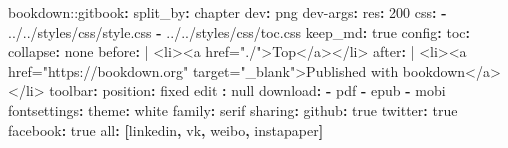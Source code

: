 \documentclass[
  nomag]{bxjsbook}
\newenvironment{Shaded}{\begin{snugshade}}{\end{snugshade}}
\newcommand{\AttributeTok}[1]{\textcolor[rgb]{0.77,0.63,0.00}{#1}}
\newcommand{\CharTok}[1]{\textcolor[rgb]{0.31,0.60,0.02}{#1}}
\newcommand{\DecValTok}[1]{\textcolor[rgb]{0.00,0.00,0.81}{#1}}
\newcommand{\FunctionTok}[1]{\textcolor[rgb]{0.00,0.00,0.00}{#1}}
\newcommand{\KeywordTok}[1]{\textcolor[rgb]{0.13,0.29,0.53}{\textbf{#1}}}
\newcommand{\NormalTok}[1]{#1}
\newcommand{\StringTok}[1]{\textcolor[rgb]{0.31,0.60,0.02}{#1}}
\theoremstyle{definition}
\theoremstyle{definition}
\theoremstyle{definition}
\theoremstyle{remark}
\begin{document}
\begin{Shaded}
\begin{Highlighting}[]
\AttributeTok{bookdown:}\FunctionTok{:gitbook}\KeywordTok{:}
\AttributeTok{  }\FunctionTok{split\_by}\KeywordTok{:}\AttributeTok{ chapter}
\AttributeTok{  }\FunctionTok{dev}\KeywordTok{:}\AttributeTok{ png}
\AttributeTok{  }\FunctionTok{dev{-}args}\KeywordTok{:}
\AttributeTok{    }\FunctionTok{res}\KeywordTok{:}\AttributeTok{ }\DecValTok{200}
\AttributeTok{  }\FunctionTok{css}\KeywordTok{:}\AttributeTok{ }
\AttributeTok{    }\KeywordTok{{-}}\AttributeTok{ }\StringTok{\textquotesingle{}../../styles/css/style.css\textquotesingle{}}
\AttributeTok{    }\KeywordTok{{-}}\AttributeTok{ }\StringTok{\textquotesingle{}../../styles/css/toc.css\textquotesingle{}}
\AttributeTok{  }\FunctionTok{keep\_md}\KeywordTok{:}\AttributeTok{ }\CharTok{true}
\AttributeTok{  }\FunctionTok{config}\KeywordTok{:}
\AttributeTok{    }\FunctionTok{toc}\KeywordTok{:}
\AttributeTok{      }\FunctionTok{collapse}\KeywordTok{:}\AttributeTok{ none}
\FunctionTok{      before}\KeywordTok{: }\CharTok{|}
\NormalTok{        \textless{}li\textgreater{}\textless{}a href="./"\textgreater{}Top\textless{}/a\textgreater{}\textless{}/li\textgreater{}}
\FunctionTok{      after}\KeywordTok{: }\CharTok{|}
\NormalTok{        \textless{}li\textgreater{}\textless{}a href="https://bookdown.org" target="\_blank"\textgreater{}Published with bookdown\textless{}/a\textgreater{}\textless{}/li\textgreater{}}
\AttributeTok{    }\FunctionTok{toolbar}\KeywordTok{:}
\AttributeTok{      }\FunctionTok{position}\KeywordTok{:}\AttributeTok{ fixed}
\AttributeTok{    }\FunctionTok{edit }\KeywordTok{:}\AttributeTok{ }\CharTok{null}
\AttributeTok{    }\FunctionTok{download}\KeywordTok{:}
\AttributeTok{      }\KeywordTok{{-}}\AttributeTok{ pdf}
\AttributeTok{      }\KeywordTok{{-}}\AttributeTok{ epub}
\AttributeTok{      }\KeywordTok{{-}}\AttributeTok{ mobi}
\AttributeTok{    }\FunctionTok{fontsettings}\KeywordTok{:}
\AttributeTok{      }\FunctionTok{theme}\KeywordTok{:}\AttributeTok{ white}
\AttributeTok{      }\FunctionTok{family}\KeywordTok{:}\AttributeTok{ serif}
\AttributeTok{    }\FunctionTok{sharing}\KeywordTok{:}
\AttributeTok{      }\FunctionTok{github}\KeywordTok{:}\AttributeTok{ }\CharTok{true}
\AttributeTok{      }\FunctionTok{twitter}\KeywordTok{:}\AttributeTok{ }\CharTok{true}
\AttributeTok{      }\FunctionTok{facebook}\KeywordTok{:}\AttributeTok{ }\CharTok{true}
\AttributeTok{      }\FunctionTok{all}\KeywordTok{:}\AttributeTok{ }\KeywordTok{[}\StringTok{\textquotesingle{}linkedin\textquotesingle{}}\KeywordTok{,}\AttributeTok{ }\StringTok{\textquotesingle{}vk\textquotesingle{}}\KeywordTok{,}\AttributeTok{ }\StringTok{\textquotesingle{}weibo\textquotesingle{}}\KeywordTok{,}\AttributeTok{ }\StringTok{\textquotesingle{}instapaper\textquotesingle{}}\KeywordTok{]}
\end{Highlighting}
\end{Shaded}
\end{document}
